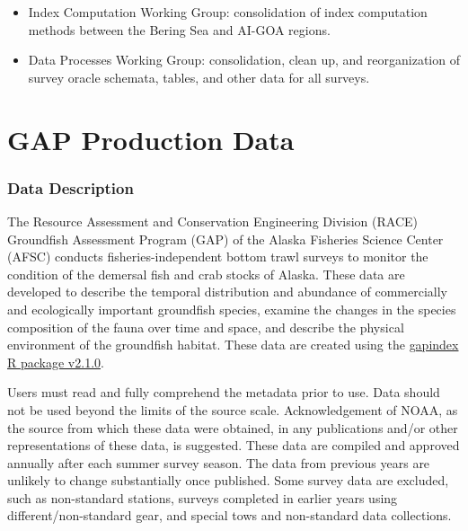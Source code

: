 \documentclass[
  letterpaper,
  oneside,
  open=any]{scrbook}
\begin{document}
\begin{itemize}
  \begin{itemize}
  \item
    Index Computation Working Group: consolidation of index computation
    methods between the Bering Sea and AI-GOA regions.
  \item
    Data Processes Working Group: consolidation, clean up, and
    reorganization of survey oracle schemata, tables, and other data for
    all surveys.
  \end{itemize}
\end{itemize}

\part{GAP Production Data}

\hypertarget{data-description}{%
\section*{Data Description}\label{data-description}}


The Resource Assessment and Conservation Engineering Division (RACE)
Groundfish Assessment Program (GAP) of the Alaska Fisheries Science
Center (AFSC) conducts fisheries-independent bottom trawl surveys to
monitor the condition of the demersal fish and crab stocks of Alaska.
These data are developed to describe the temporal distribution and
abundance of commercially and ecologically important groundfish species,
examine the changes in the species composition of the fauna over time
and space, and describe the physical environment of the groundfish
habitat. These data are created using the
\href{https://afsc-gap-products.github.io/gapindex/index.html}{gapindex
R package v2.1.0}.

Users must read and fully comprehend the metadata prior to use. Data
should not be used beyond the limits of the source scale.
Acknowledgement of NOAA, as the source from which these data were
obtained, in any publications and/or other representations of these
data, is suggested. These data are compiled and approved annually after
each summer survey season. The data from previous years are unlikely to
change substantially once published. Some survey data are excluded, such
as non-standard stations, surveys completed in earlier years using
different/non-standard gear, and special tows and non-standard data
collections.
\end{document}
